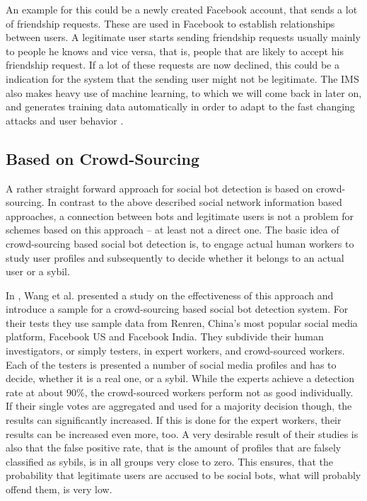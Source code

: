 An example for this could be a newly created Facebook account, that sends a lot of friendship requests. These are used in Facebook to establish relationships between users. A legitimate user starts sending friendship requests usually mainly to people he knows and vice versa, that is, people that are likely to accept his friendship request. If a lot of these requests are now declined, this could be a indication for the system that the sending user might not be legitimate.  The IMS also makes heavy use of machine learning, to which we will come back in later on, and generates training data automatically in order to adapt to the fast changing attacks and user behavior \cite{fis}.

\subsection{Based on Crowd-Sourcing}
A rather straight forward approach for social bot detection is based on crowd-sourcing. In contrast to the above described social network information based approaches, a connection between bots and legitimate users is not a problem for schemes based on this approach -- at least not a direct one. The basic idea of crowd-sourcing based social bot detection is, to engage actual human workers to study user profiles and subsequently to decide whether it belongs to an actual user or a sybil.

In \cite{wangcrowd}, Wang et al. presented a study on the effectiveness of this approach and introduce a sample for a crowd-sourcing based social bot detection system.  For their tests they use sample data from Renren, China's most popular social media platform, Facebook US and Facebook India. They subdivide their human investigators, or simply testers, in expert workers, and crowd-sourced workers.  Each of the testers is presented a number of social media profiles and has to decide, whether it is a real one, or a sybil. While the experts achieve a detection rate at about 90\%, the crowd-sourced workers perform not as good individually. If their single votes are aggregated and used for a majority decision though, the results can significantly increased. If this is done for the expert workers, their results can be increased even more, too. A very desirable result of their studies is also that the false positive rate, that is the amount of profiles that are falsely classified as sybils, is in all groups very close to zero. This ensures, that the probability that legitimate users are accused to be social bots, what will probably offend them, is very low.


